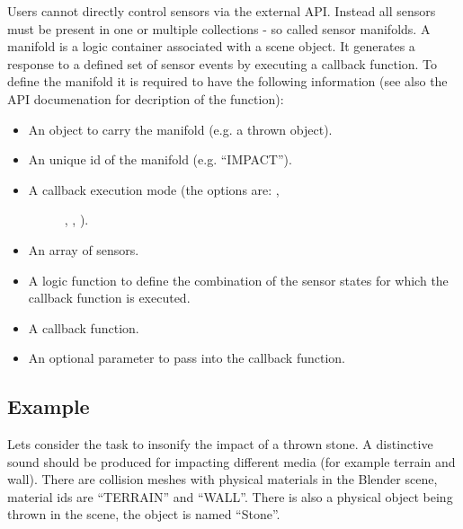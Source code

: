 \documentclass[a4paper,12pt,oneside]{sphinxmanual}
\begin{document}
Users cannot directly control sensors via the external API. Instead all sensors must be present in one or multiple collections - so called sensor manifolds. A manifold is a logic container associated with a scene object. It generates a response to a defined set of sensor events by executing a callback function. To define the manifold it is required to have the following information (see also the API documenation for decription of the  function):
\begin{itemize}
\item {} 
An object to carry the manifold (e.g. a thrown object).

\item {} 
An unique id of the manifold (e.g. ``IMPACT'').

\item {} \begin{description}
\item[{A callback execution mode (the options are: ,}] \leavevmode
{}, , ).

\end{description}

\item {} 
An array of sensors.

\item {} 
A logic function to define the combination of the sensor states for which the callback function is executed.

\item {} 
A callback function.

\item {} 
An optional parameter to pass into the callback function.

\end{itemize}


\subsection{Example}
\label{developers:id10}
Lets consider the task to insonify the impact of a thrown stone. A distinctive sound should be produced for impacting different media (for example terrain and wall). There are collision meshes with physical materials in the Blender scene, material ids are ``TERRAIN'' and ``WALL''. There is also a physical object being thrown in the scene, the object is named ``Stone''.
\end{document}
